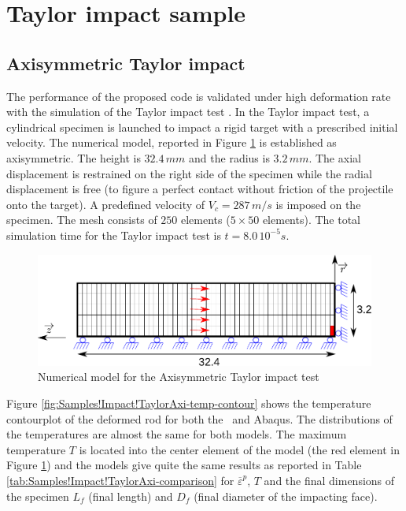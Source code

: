 \section{Taylor impact sample}

\subsection{Axisymmetric Taylor impact}

The performance of the proposed code is validated under high deformation
rate with the simulation of the Taylor impact test \cite{taylor1946james}.
In the Taylor impact test, a cylindrical specimen is launched to impact
a rigid target with a prescribed initial velocity. The numerical model,
reported in Figure \ref{fig:Samples!Impact!TaylorAxi} is established
as axisymmetric. The height is $32.4\,mm$ and the radius is $3.2\,mm$.
The axial displacement is restrained on the right side of the specimen
while the radial displacement is free (to figure a perfect contact
without friction of the projectile onto the target). A predefined
velocity of $V_{c}=287\,m/s$ is imposed on the specimen. The mesh
consists of $250$ elements ($5\times50$ elements). The total simulation
time for the Taylor impact test is $t=8.0\,10^{-5}s$.

\begin{figure}[h]
\begin{centering}
\includegraphics[width=0.75\columnwidth]{Figures/TaylorAxi}
\par\end{centering}
\caption{Numerical model for the Axisymmetric Taylor impact test\label{fig:Samples!Impact!TaylorAxi}}
\end{figure}

Figure \ref{fig:Samples!Impact!TaylorAxi-temp-contour} shows the
temperature contourplot of the deformed rod for both the \Dynela~and
Abaqus. The distributions of the temperatures are almost the same
for both models. The maximum temperature $T$ is located into the
center element of the model (the red element in Figure \ref{fig:Samples!Impact!TaylorAxi})
and the models give quite the same results as reported in Table \ref{tab:Samples!Impact!TaylorAxi-comparison}
for $\overline{\varepsilon}^{p}$, $T$ and the final dimensions of
the specimen $L_{f}$ (final length) and $D_{f}$ (final diameter
of the impacting face). 

